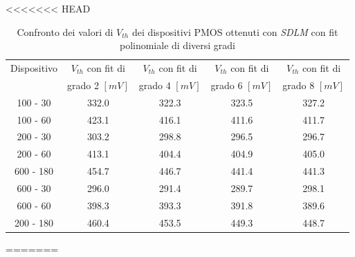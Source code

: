 \documentclass[12pt, letterpaper]{book}
\begin{document}
<<<<<<< HEAD
\begin{table}[htp] 
\renewcommand{\arraystretch}{1.3}
\caption{Confronto dei valori di $V_{th}$ dei dispositivi PMOS ottenuti con \emph{SDLM} con fit polinomiale di diversi gradi}
\label{tab:GradiSDLM} 
\begin{center}
\begin{tabular}{c c c c c}
\hline
Dispositivo &  $V_{th}$  con fit di & $V_{th}$  con fit di & $V_{th}$  con fit di & $V_{th}$  con fit di \\
 & grado 2 $[mV]$ & grado 4 $[mV]$ & grado 6 $[mV]$ & grado 8 $[mV]$ \\
\hline
100 - 30  & 332.0 & 322.3 & 323.5 & 327.2 \\
\hline
100 - 60  & 423.1 & 416.1 & 411.6 & 411.7 \\
\hline
200 - 30  & 303.2 & 298.8 & 296.5 & 296.7 \\
\hline
200 - 60 & 413.1 & 404.4 & 404.9 & 405.0 \\
\hline
600 - 180 & 454.7  & 446.7 & 441.4 & 441.3 \\
\hline
600 - 30 & 296.0 & 291.4 & 289.7 & 298.1 \\
\hline
600 - 60 & 398.3 & 393.3 & 391.8 & 389.6 \\
\hline
200 - 180  & 460.4 & 453.5 & 449.3 & 448.7\\
\hline
\end{tabular}
\end{center}
\end{table} 
=======
\end{document}
